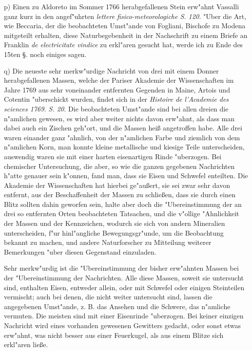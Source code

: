 \documentclass[a4paper, 11pt, oneside, polutonikogreek, german]{article}
\begin{document}
p) Einen zu Aldoreto im Sommer 1766 herabgefallenen Stein erw"ahnt Vassalli ganz kurz in den angef"uhrten \emph{lettere fisico-meteorologiche S. 120.} "Uber die Art, wie Beccaria, der die beobachteten Umst"ande von Fogliani, Bischofe zu Modena mitgeteilt erhalten, diese Naturbegebenheit in der Nachschrift zu einem Briefe an Franklin \emph{de electricitate vindice} zu erkl"aren gesucht hat, werde ich zu Ende des 15ten §. noch einiges sagen.

q) Die neueste sehr merkw"urdige Nachricht von drei mit einem Donner herabgefallenen Massen, welche der Pariser Akademie der Wissenschaften im Jahre 1769 aus sehr voneinander entfernten Gegenden in Maine, Artois und Cotentin "uberschickt wurden, findet sich in der \emph{Histoire de l'Academie des sciences 1769. S. 20.} Die beobachteten Umst"ande sind bei allen dreien die n"amlichen gewesen, es wird aber weiter nichts davon erw"ahnt, als dass man dabei auch ein Zischen geh"ort, und die Massen heiß angetroffen habe. Alle drei waren einander ganz "ahnlich, von der n"amlichen Farbe und ziemlich von dem n"amlichen Korn, man konnte kleine metallische und kiesige Teile unterscheiden, auswendig waren sie mit einer harten eisenartigen Rinde "uberzogen. Bei chemischer Untersuchung, die aber, so wie die ganzen gegebenen Nachrichten h"atte genauer sein k"onnen, fand man, dass sie Eisen und Schwefel enteilten. Die Akademie der Wissenschaften hat hierbei ge"außert, sie sei zwar sehr davon entfernt, aus der Beschaffenheit der Massen zu schließen, dass sie durch einen Blitz sollten dahin geworfen sein, halte aber doch die "Ubereinstimmung der an drei so entfernten Orten beobachteten Tatsachen, und die v"ollige "Ahnlichkeit der Massen und der Kennzeichen, wodurch sie sich von andern Mineralien unterscheiden, f"ur hinl"angliche Bewegungsgr"unde, um die Beobachtung bekannt zu machen, und andere Naturforscher zu Mitteilung weiterer Bemerkungen "uber diesen Gegenstand einzuladen.

Sehr merkw"urdig ist die "Ubereinstimmung der bisher erw"ahnten Massen bei der "Ubereinstimmung der Nachrichten. Alle diese Massen, soweit sie untersucht sind, enthalten Eisen, entweder allein, oder mit Schwefel oder einigen Steinteilen vermischt; auch bei denen, die nicht weiter untersucht sind, lassen die angegebenen Umst"ande, z. B. das Ansehen und die Schwere, das n"amliche vermuten. Die meisten sind mit einer Eisenrinde "uberzogen. Bei keiner einzigen Nachricht wird eines vorhanden gewesenen Gewitters gedacht, oder sonst etwas erw"ahnt, was nicht besser aus einer Feuerkugel, als aus einem Blitze sich erkl"aren ließe.
\end{document}
